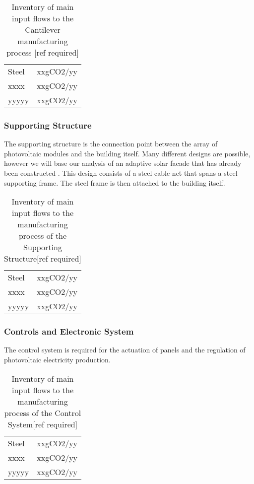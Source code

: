 \begin{table}[H]
\centering
\begin{tabular}{ll}
\hline
Steel & xxgCO2/yy \\
xxxx  & xxgCO2/yy \\
yyyyy & xxgCO2/yy \\
\hline
\end{tabular}
\caption{Inventory of main input flows to the Cantilever manufacturing process [ref required]}
\label{tab:CantileverInv}
\end{table}

\subsubsection*{Supporting Structure}
The supporting structure is the connection point between the array of photovoltaic modules and the building itself. Many different designs are possible, however we will base our analysis of an adaptive solar facade that has already been constructed \cite{nagy2015frontiers}. This design consists of a steel cable-net that spans a steel supporting frame. The steel frame is then attached to the building itself.\\

\begin{table}[H]
\centering
\begin{tabular}{ll}
\hline
Steel & xxgCO2/yy \\
xxxx  & xxgCO2/yy \\
yyyyy & xxgCO2/yy \\
\hline
\end{tabular}
\caption{Inventory of main input flows to the manufacturing process of the Supporting Structure[ref required]}
\label{tab:StructureInv}
\end{table}

\subsubsection*{Controls and Electronic System}
The control system is required for the actuation of panels and the regulation of photovoltaic electricity production.\\

\begin{table}[H]
\centering
\begin{tabular}{ll}
\hline
Steel & xxgCO2/yy \\
xxxx  & xxgCO2/yy \\
yyyyy & xxgCO2/yy \\
\hline
\end{tabular}
\caption{Inventory of main input flows to the manufacturing process of the Control System[ref required]}
\label{tab:ControlInv}
\end{table}

